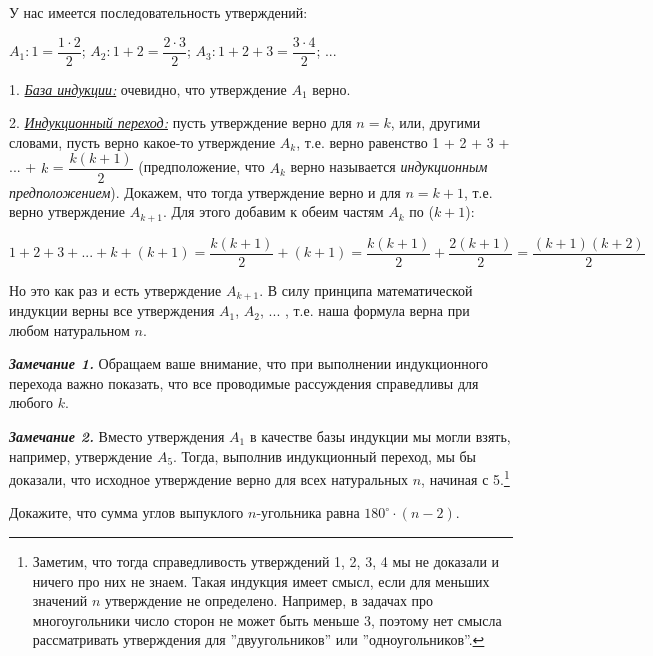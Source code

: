 \begin{prf}
У нас имеется последовательность утверждений:
\par
$A_1 : 1 = \dfrac{1 \cdot 2}{2}$;
\hfill
$A_2 : 1 + 2 = \dfrac{2 \cdot 3}{2}$;
\hfill
$A_3 : 1 + 2 + 3  = \dfrac{3 \cdot 4}{2}$;
\hfill
...
\par
1. \textit{\underline{База индукции:}} очевидно, что утверждение $A_1$ верно.
\par
2. \textit{\underline{Индукционный переход:}} пусть утверждение верно для $n = k$, или, другими словами, пусть верно какое-то
утверждение $A_k$, т.е. верно равенство 1 + 2 + 3 + ... + $k$ = $\dfrac{k(k+1)}{2}$ (предположение, что $A_k$ верно называется
\textit{индукционным предположением}). Докажем, что тогда утверждение верно и для $n = k +1$, т.е. верно утверждение $A_{k+1}$. Для этого добавим к обеим частям $A_k$ по ($k + 1$):

$$1 + 2 + 3 + ... + k + (k + 1) = \dfrac{k(k+1)}{2} + (k + 1) = \dfrac{k(k+1)}{2} + \dfrac{2(k+1)}{2} = \dfrac{(k+1)(k+2)}{2}$$

Но это как раз и есть утверждение $A_{k+1}$. В силу принципа математической индукции верны все утверждения
$A_1$, $A_2$, ... , т.е. наша формула верна при любом натуральном $n$.
\end{prf}

\par

\textbf{\textit{Замечание 1.}} Обращаем ваше внимание, что при выполнении индукционного перехода важно показать, что
все проводимые рассуждения справедливы для любого $k$.

\textbf{\textit{Замечание 2.}} Вместо утверждения $A_1$ в качестве базы индукции мы могли взять, например, утверждение $A_5$. Тогда, выполнив индукционный переход, мы бы доказали, что исходное утверждение верно для всех натуральных $n$, начиная с 5.\footnote{Заметим, что тогда справедливость утверждений 1, 2, 3, 4 мы не доказали и ничего про них не знаем. Такая индукция имеет смысл, если для меньших значений $n$ утверждение не определено. Например, в задачах про многоугольники число сторон не может быть меньше 3, поэтому нет смысла рассматривать утверждения для ''двуугольников'' или
''одноугольников''.}

\begin{thm}
Докажите, что сумма углов выпуклого $n$-угольника равна $180 ^{\circ} \cdot (n-2)$.
\end{thm}

